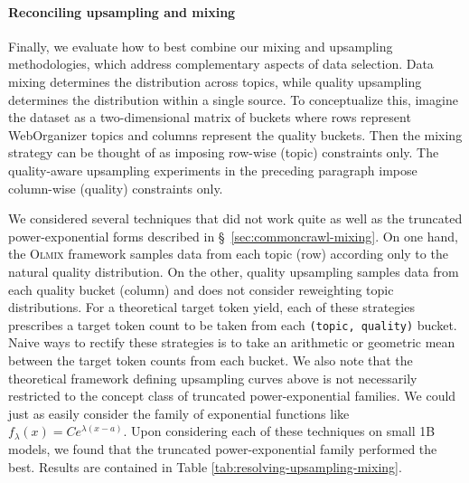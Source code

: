 \documentclass[table]{ai2style/ai2}
\newcommand{\olmix}{\textsc{Olmix}\xspace}
\begin{document}
{{\paragraph{Reconciling upsampling and mixing} Finally, we evaluate how to best combine our mixing and upsampling methodologies, which address complementary aspects of data selection. Data mixing determines the distribution across topics, while quality upsampling determines the distribution within a single source. To conceptualize this, imagine the dataset as a two-dimensional matrix of buckets where rows represent WebOrganizer topics and columns represent the quality buckets. Then the mixing strategy can be thought of as imposing row-wise (topic) constraints only. The quality-aware upsampling experiments in the preceding paragraph impose column-wise (quality) constraints only.

We considered several techniques that did not work quite as well as the truncated power-exponential forms described in \S~\ref{sec:commoncrawl-mixing}. On one hand, the \olmix framework samples data from each topic (row) according only to the natural quality distribution. On the other, quality upsampling samples data from each quality bucket (column) and does not consider reweighting topic distributions. For a theoretical target token yield, each of these strategies prescribes a target token count to be taken from each \texttt{(topic, quality)} bucket. Naive ways to rectify these strategies is to take an arithmetic or geometric mean between the target token counts from each bucket. We also note that the theoretical framework defining upsampling curves above is not necessarily restricted to the concept class of truncated power-exponential families. We could just as easily consider the family of exponential functions like $f_\lambda(x) = Ce^{\lambda(x-a)}$. Upon considering each of these techniques on small 1B models, we found that the truncated power-exponential family performed the best. Results are contained in Table \ref{tab:resolving-upsampling-mixing}.

\begin{table}[tbp]
\centering


\end{table}}}
\end{document}
